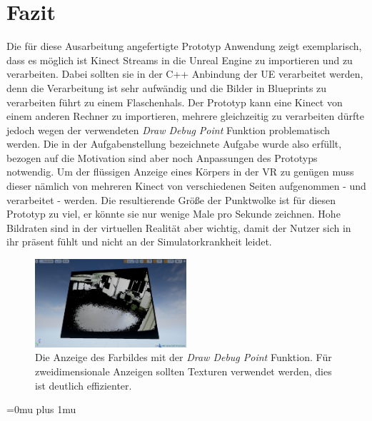 \documentclass[a4paper]{IEEEtran}
\begin{document}
	


\section{Fazit}
	Die für diese Ausarbeitung angefertigte Prototyp Anwendung zeigt exemplarisch, dass es möglich ist Kinect Streams in die Unreal Engine zu importieren und zu verarbeiten.
	Dabei sollten sie in der C++ Anbindung der UE verarbeitet werden, denn die Verarbeitung ist sehr aufwändig und die Bilder in Blueprints zu verarbeiten führt zu einem Flaschenhals.
	Der Prototyp kann eine Kinect von einem anderen Rechner zu importieren, mehrere gleichzeitig zu verarbeiten dürfte jedoch wegen der verwendeten {\textit{Draw Debug Point}} Funktion problematisch werden. 
	Die in der Aufgabenstellung bezeichnete Aufgabe wurde also erfüllt, bezogen auf die Motivation sind aber noch Anpassungen des Prototyps notwendig.
	Um der flüssigen Anzeige eines Körpers in der VR zu genügen muss dieser nämlich von mehreren Kinect von verschiedenen Seiten aufgenommen - und verarbeitet - werden. 
	Die resultierende Größe der Punktwolke ist für diesen Prototyp zu viel, er könnte sie nur wenige Male pro Sekunde zeichnen. 
	Hohe Bildraten sind in der virtuellen Realität aber wichtig, damit der Nutzer sich in ihr präsent fühlt und nicht an der Simulatorkrankheit leidet. \\[0.5cm]
	
	\begin{figure}[!h]
    	\centering
		\includegraphics[width=0.5\textwidth]{img/2DColor}
	    \caption{Die Anzeige des Farbildes mit der {\textit{Draw Debug Point}} Funktion. Für zweidimensionale Anzeigen sollten Texturen verwendet werden, dies ist deutlich effizienter.}
    	\label{2DColor}
	\end{figure} 
	


\Urlmuskip=0mu plus 1mu\relax


\end{document}

